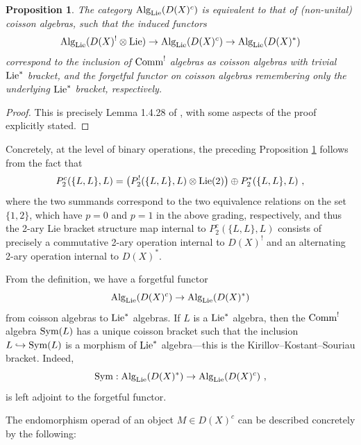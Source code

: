 \documentclass[11pt]{amsart}
\numberwithin{equation}{section}
\newtheorem{prop}[theo]{Proposition}
\theoremstyle{definition}
\newcommand{\Alg}{{\textup{Alg}}}
\newcommand{\Comm}{{\textup{Comm}}}
\newcommand{\Lie}{{\textup{Lie}}}
\newcommand{\0}{{\textbf{0}}}
\newcommand{\DD}{{D}}
\newcommand{\Sym}{\textup{Sym}}
\begin{document}
\begin{prop}\label{CoisLieprop} The category $\Alg_{\Lie}(\DD(X)^c)$ is equivalent to that of (non-unital) coisson algebras, such that the induced functors
\[ \Alg_{\Lie}(\DD(X)^! \otimes \Lie) \to  \Alg_{\Lie}(\DD(X)^c) \to  \Alg_{\Lie}(\DD(X)^*) \]
correspond to the inclusion of $\Comm^!$ algebras as coisson algebras with trivial $\Lie^*$ bracket, and the forgetful functor on coisson algebras remembering only the underlying $\Lie^*$ bracket, respectively.
\end{prop}
\begin{proof}
This is precisely Lemma 1.4.28 of \cite{BD1}, with some aspects of the proof explicitly stated. 
\end{proof}
Concretely, at the level of binary operations, the preceding Proposition \ref{CoisLieprop} follows from the fact that
\begin{equation}\label{cl2arydecompeqn}
	 P_2^c(\{L,L\},L) =\left( P_2^!(\{L,L\},L)\otimes \Lie(2)\right)  \oplus P_2^*(\{L,L\},L) ~,
\end{equation}
where the two summands correspond to the two equivalence relations on the set $\{1,2\}$, which have $p=0$ and $p=1$ in the above grading, respectively, and thus the 2-ary Lie bracket structure map internal to $P_2^c(\{L,L\},L)$ consists of precisely a commutative 2-ary operation internal to $\DD(X)^!$ and an alternating 2-ary operation internal to $\DD(X)^*$.



From the definition, we have a forgetful functor
\[
\Alg_{\Lie}(\DD(X)^c) \rightarrow \Alg_{\Lie}(\DD(X)^*)
\]
from coisson algebras to $\Lie^*$ algebras. If $L$ is a $\Lie^*$ algebra, then the $\Comm^!$ algebra $\Sym(L)$ has a unique coisson bracket such that the inclusion $L\hookrightarrow \Sym(L)$ is a morphism of $\Lie^*$ algebra---this is the Kirillov--Kostant--Souriau bracket. Indeed,
\[
\Sym: \Alg_{\Lie}(\DD(X)^*)\rightarrow \Alg_{\Lie}(\DD(X)^c)~,
\]
is left adjoint to the forgetful functor.


The endomorphism operad of an object $M\in \DD(X)^c$ can be described concretely by the following:
\end{document}
